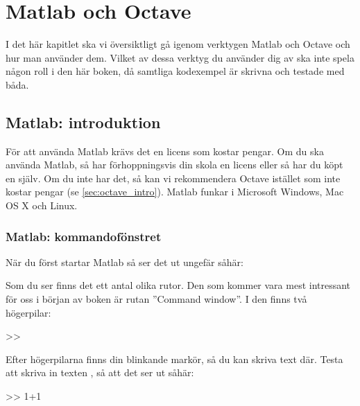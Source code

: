 %
%
\chapter{Matlab och Octave}\label{ch:installation}
I det här kapitlet ska vi översiktligt gå igenom verktygen Matlab och Octave och hur man använder dem. Vilket av dessa verktyg du använder dig av ska inte spela någon roll i den här boken, då samtliga kodexempel är skrivna och testade med båda.
\newpage
\section{Matlab: introduktion}
För att använda Matlab krävs det en licens som kostar pengar. Om du ska använda Matlab, så har förhoppningsvis din skola en licens eller så har du köpt en själv. Om du inte har det, så kan vi rekommendera Octave istället som inte kostar pengar (se \autoref{sec:octave_intro}). Matlab funkar i Microsoft Windows, Mac OS X och Linux.

\subsection{Matlab: kommandofönstret}
När du först startar Matlab så ser det ut ungefär såhär:


Som du ser finns det ett antal olika rutor. Den som kommer vara mest intressant för oss i början av boken är rutan ''Command window''. I den finns två högerpilar:

\begin{matlab}[caption={Tom kommando-rad},label={}]
>>
\end{matlab}

Efter högerpilarna finns din blinkande markör, så du kan skriva text där. Testa att skriva in texten , så att det ser ut såhär:

\begin{matlab}[caption={Skrivit in lite matte},label={}]
>> 1+1
\end{matlab}

